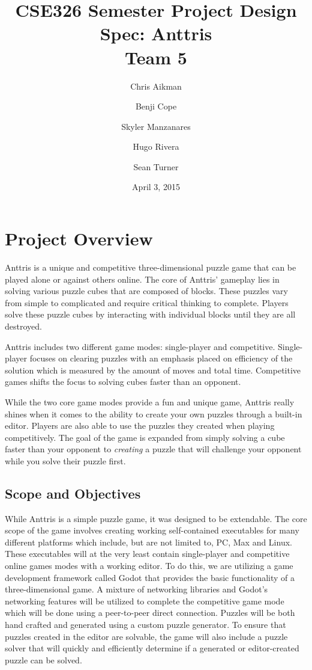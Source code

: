 \documentclass[12pt]{article}
\begin{document}
\sf %
\title{CSE326 Semester Project Design Spec: Anttris\\
{\Large Team 5}}
\author{
\and Chris Aikman
\and Benji Cope
\and Skyler Manzanares
\and Hugo Rivera
\and Sean Turner}
\date{April 3, 2015}
\maketitle

\section{Project Overview} %
Anttris is a unique and competitive three-dimensional puzzle game that can be played alone or against others online. The core of Anttris' gameplay lies in solving various puzzle cubes that are composed of blocks. These puzzles vary from simple to complicated and require critical thinking to complete. Players solve these puzzle cubes by interacting with individual blocks until they are all destroyed.

Anttris includes two different game modes: single-player and competitive. Single-player focuses on clearing puzzles with an emphasis placed on efficiency of the solution which is measured by the amount of moves and total time. Competitive games shifts the focus to solving cubes faster than an opponent.

While the two core game modes provide a fun and unique game, Anttris really shines when it comes to the ability to create your own puzzles through a built-in editor. Players are also able to use the puzzles they created when playing competitively. The goal of the game is expanded from simply solving a cube faster than your opponent to \textsl{creating} a puzzle that will challenge your opponent while you solve their puzzle first.
\subsection{Scope and Objectives} %
While Anttris is a simple puzzle game, it was designed to be extendable. The core scope of the game involves creating working self-contained executables for many different platforms which include, but are not limited to, PC, Max and Linux. These executables will at the very least contain single-player and competitive online games modes with a working editor. To do this, we are utilizing a game development framework called Godot \cite{godot:gameengine} that provides the basic functionality of a three-dimensional game. A mixture of networking libraries and Godot's networking features will be utilized to complete the competitive game mode which will be done using a peer-to-peer direct connection. Puzzles will be both hand crafted and generated using a custom puzzle generator. To ensure that puzzles created in the editor are solvable, the game will also include a puzzle solver that will quickly and efficiently determine if a generated or editor-created puzzle can be solved.
\end{document}

